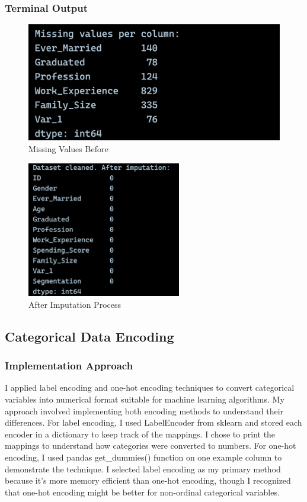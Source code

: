 \documentclass[12pt,a4paper]{article}
\begin{document}
\subsubsection{Terminal Output}

\begin{figure}[h!]
    \centering
    \includegraphics[width=\textwidth]{Figures/missing_values_before.png}
    \caption{Missing Values Before}
    \label{fig:missing_before}
\end{figure}

\begin{figure}[h!]
    \centering
    \includegraphics[width=0.6\textwidth]{Figures/missing_values_after.png}
    \caption{After Imputation Process}
    \label{fig:missing_after}
\end{figure}

\newpage
\subsection{Categorical Data Encoding}

\subsubsection{Implementation Approach}
I applied label encoding and one-hot encoding techniques to convert categorical variables into numerical format suitable for machine learning algorithms. My approach involved implementing both encoding methods to understand their differences. For label encoding, I used LabelEncoder from sklearn and stored each encoder in a dictionary to keep track of the mappings. I chose to print the mappings to understand how categories were converted to numbers. For one-hot encoding, I used pandas get\_dummies() function on one example column to demonstrate the technique. I selected label encoding as my primary method because it's more memory efficient than one-hot encoding, though I recognized that one-hot encoding might be better for non-ordinal categorical variables.
\end{document}
